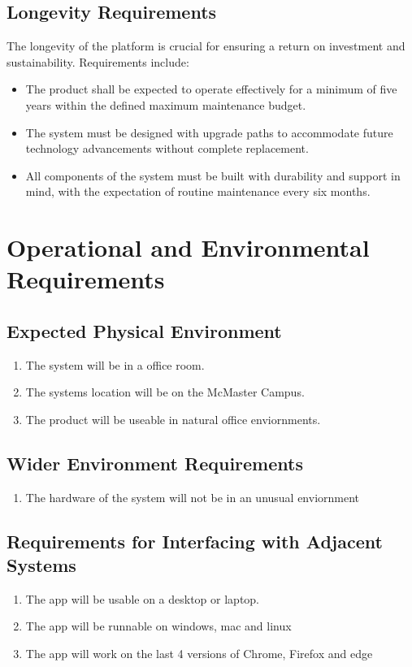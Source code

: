 \documentclass[12pt]{article}
\begin{document}
\subsection{Longevity Requirements}
The longevity of the platform is crucial for ensuring a return on investment and sustainability. Requirements include:

\begin{itemize}
    \item The product shall be expected to operate effectively for a minimum of five years within the defined maximum maintenance budget.
    \item The system must be designed with upgrade paths to accommodate future technology advancements without complete replacement.
    \item All components of the system must be built with durability and support in mind, with the expectation of routine maintenance every six months.
\end{itemize}


\section{Operational and Environmental Requirements}
\subsection{Expected Physical Environment}
\begin{enumerate}
  \item The system will be in a office room.
  \item The systems location will be on the McMaster Campus. 
  \item The product will be useable in natural office enviornments. 
\end{enumerate}
\subsection{Wider Environment Requirements}
\begin{enumerate}
  \item The hardware of the system will not be in an unusual enviornment
\end{enumerate}

\subsection{Requirements for Interfacing with Adjacent Systems}
\begin{enumerate}
  \item The app will be usable on a desktop or laptop.
  \item The app will be runnable on windows, mac and linux 
  \item The app will work on the last 4 versions of Chrome, Firefox and edge 
\end{enumerate}
\end{document}
